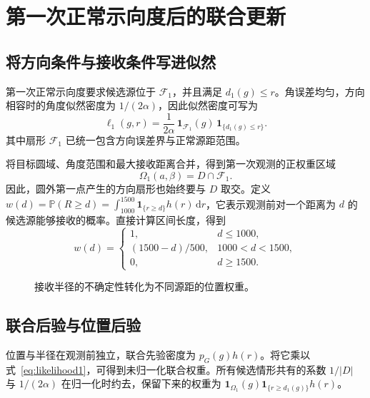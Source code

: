\documentclass[UTF8,a4paper,zihao=-4,fontset=none]{ctexart}
\numberwithin{equation}{section}
\newcommand{\ind}{\mathbf 1}
\newcommand{\dd}{\,\mathrm d}
\newcommand{\Prob}{\mathbb P}
\begin{document}
\section{第一次正常示向度后的联合更新}
\subsection{将方向条件与接收条件写进似然}
第一次正常示向度要求候选源位于 \(\mathcal F_1\)，并且满足 \(d_1(g)\le r\)。角误差均匀，方向相容时的角度似然密度为 \(1/(2\alpha)\)，因此似然密度可写为
\begin{equation}\label{eq:likelihood1}
\ell_1(g,r)=\frac{1}{2\alpha}\,\ind_{\mathcal F_1}(g)\,\ind_{\{d_1(g)\le r\}}.
\end{equation}
其中扇形 \(\mathcal F_1\) 已统一包含方向误差界与正常源距范围。

将目标圆域、角度范围和最大接收距离合并，得到第一次观测的正权重区域
\begin{equation}\label{eq:omega-ab}
\Omega_1(a,\beta)=D\cap\mathcal F_1.
\end{equation}
因此，圆外第一点产生的方向扇形也始终要与 \(D\) 取交。定义 \(w(d)=\Prob(R\ge d)=\int_{1000}^{1500}\ind_{\{r\ge d\}}h(r)\dd r\)，它表示观测前对一个距离为 \(d\) 的候选源能够接收的概率。直接计算区间长度，得到
\begin{equation}\label{eq:tail}
 w(d)=
 \begin{cases}
 1,&d\le1000,\\
 (1500-d)/500,&1000<d<1500,\\
 0,&d\ge1500.
 \end{cases}
\end{equation}

\begin{figure}[H]\centering
{}
\caption{接收半径的不确定性转化为不同源距的位置权重。}
\end{figure}

\subsection{联合后验与位置后验}
位置与半径在观测前独立，联合先验密度为 \(p_G(g)h(r)\)。将它乘以式~\eqref{eq:likelihood1}，可得到未归一化联合权重。所有候选情形共有的系数 \(1/|D|\) 与 \(1/(2\alpha)\) 在归一化时约去，保留下来的权重为 \(\ind_{\Omega_1}(g)\ind_{\{r\ge d_1(g)\}}h(r)\)。
\end{document}
